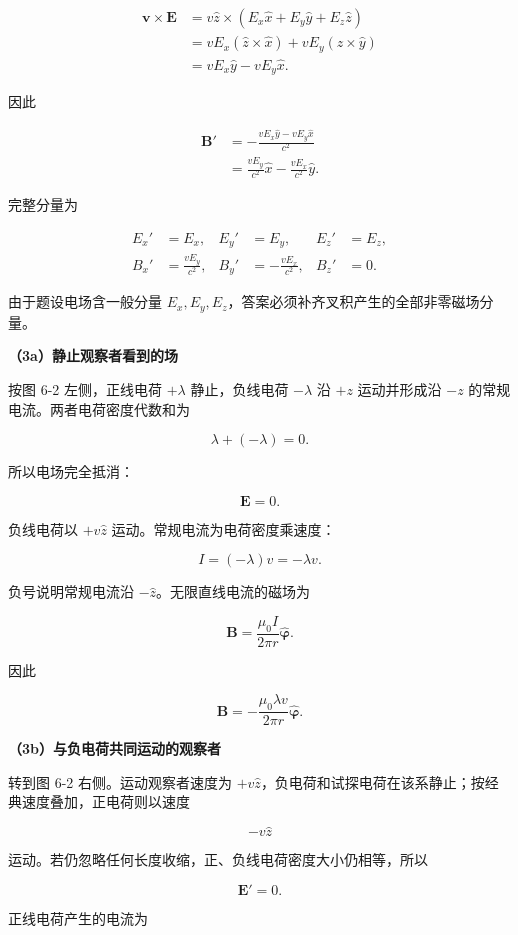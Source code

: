 \documentclass[12pt,a4paper,UTF8]{ctexart}
\begin{document}
\[
\begin{aligned}
\bm v\times\bm E
&=v\hat z\times(E_x\hat x+E_y\hat y+E_z\hat z)\\
&=vE_x(\hat z\times\hat x)+vE_y(\hat z\times\hat y)\\
&=vE_x\hat y-vE_y\hat x.
\end{aligned}
\]

因此

\[
\begin{aligned}
\bm B'
&=-\frac{vE_x\hat y-vE_y\hat x}{c^2}\\
&=\frac{vE_y}{c^2}\hat x-\frac{vE_x}{c^2}\hat y.
\end{aligned}
\]

完整分量为

\[
\boxed{
\begin{aligned}
E_x'&=E_x,& E_y'&=E_y,& E_z'&=E_z,\\
B_x'&=\frac{vE_y}{c^2},&
B_y'&=-\frac{vE_x}{c^2},&
B_z'&=0.
\end{aligned}}
\]

由于题设电场含一般分量
\(E_x,E_y,E_z\)，答案必须补齐叉积产生的全部非零磁场分量。

\textbf{（3a）静止观察者看到的场}

按图 6-2 左侧，正线电荷 \(+\lambda\) 静止，负线电荷 \(-\lambda\) 沿
\(+z\) 运动并形成沿 \(-z\) 的常规电流。两者电荷密度代数和为

\[\lambda+(-\lambda)=0.\]

所以电场完全抵消：

\[
\boxed{\bm E=0}.
\]

负线电荷以 \(+v\hat z\) 运动。常规电流为电荷密度乘速度：

\[
I=(-\lambda)v=-\lambda v.
\]

负号说明常规电流沿 \(-\hat z\)。无限直线电流的磁场为

\[
\bm B=\frac{\mu_0I}{2\pi r}\hat{\bm\varphi}.
\]

因此

\[
\boxed{
\bm B=-\frac{\mu_0\lambda v}{2\pi r}\hat{\bm\varphi}
}.
\]

\textbf{（3b）与负电荷共同运动的观察者}

转到图 6-2 右侧。运动观察者速度为
\(+v\hat z\)，负电荷和试探电荷在该系静止；按经典速度叠加，正电荷则以速度

\[-v\hat z\]

运动。若仍忽略任何长度收缩，正、负线电荷密度大小仍相等，所以

\[
\boxed{\bm E'=0}.
\]

正线电荷产生的电流为
\end{document}
